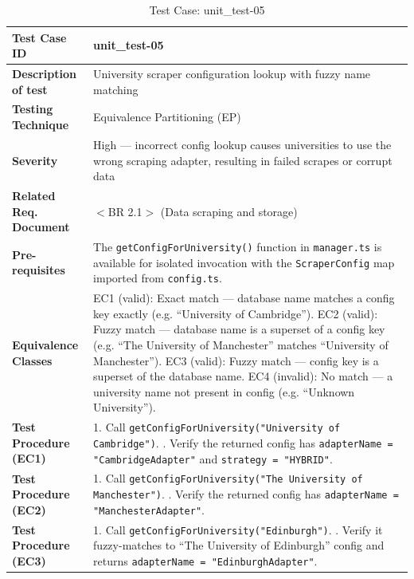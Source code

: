 \begin{table}[h!]
\centering
\caption{Test Case: unit\_test-05}
\begin{tabular}{|p{}|p{}|}
\hline
\textbf{Test Case ID} & unit\_test-05 \\ \hline
\textbf{Description of test} & University scraper configuration lookup with fuzzy name matching \\ \hline
\textbf{Testing Technique} & Equivalence Partitioning (EP) \\ \hline
\textbf{Severity} & High --- incorrect config lookup causes universities to use the wrong scraping adapter, resulting in failed scrapes or corrupt data \\ \hline
\textbf{Related Req. Document} & $<$BR 2.1$>$ (Data scraping and storage) \\ \hline
\textbf{Pre-requisites} & The \texttt{getConfigForUniversity()} function in \texttt{manager.ts} is available for isolated invocation with the \texttt{ScraperConfig} map imported from \texttt{config.ts}. \\ \hline
\textbf{Equivalence Classes} & EC1 (valid): Exact match --- database name matches a config key exactly (e.g. ``University of Cambridge''). \newline EC2 (valid): Fuzzy match --- database name is a superset of a config key (e.g. ``The University of Manchester'' matches ``University of Manchester''). \newline EC3 (valid): Fuzzy match --- config key is a superset of the database name. \newline EC4 (invalid): No match --- a university name not present in config (e.g. ``Unknown University''). \\ \hline
\textbf{Test Procedure (EC1)} & 1. Call \texttt{getConfigForUniversity("University of Cambridge")}. \newline 2. Verify the returned config has \texttt{adapterName = "CambridgeAdapter"} and \texttt{strategy = "HYBRID"}. \\ \hline
\textbf{Test Procedure (EC2)} & 1. Call \texttt{getConfigForUniversity("The University of Manchester")}. \newline 2. Verify the returned config has \texttt{adapterName = "ManchesterAdapter"}. \\ \hline
\textbf{Test Procedure (EC3)} & 1. Call \texttt{getConfigForUniversity("Edinburgh")}. \newline 2. Verify it fuzzy-matches to ``The University of Edinburgh'' config and returns \texttt{adapterName = "EdinburghAdapter"}. \\ \hline

\end{tabular}
\end{table}
